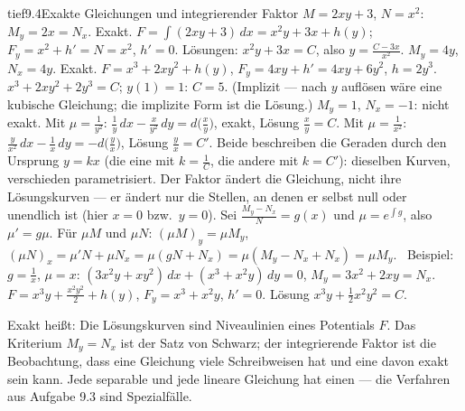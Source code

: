 \begin{loesungkarte}{tief}{9.4}{Exakte Gleichungen und integrierender Faktor}
$M = 2xy + 3$, $N = x^{2}$: $M_y = 2x = N_x$. Exakt. $F = \int(2xy + 3)\,dx = x^{2}y + 3x + h(y)$; $F_y = x^{2} + h' = N = x^{2}$, $h' = 0$. Lösungen: $x^{2}y + 3x = C$, also $y = \frac{C - 3x}{x^{2}}$.
$M_y = 4y$, $N_x = 4y$. Exakt. $F = x^{3} + 2xy^{2} + h(y)$, $F_y = 4xy + h' = 4xy + 6y^{2}$, $h = 2y^{3}$. $x^{3} + 2xy^{2} + 2y^{3} = C$; $y(1) = 1$: $C = 5$. (Implizit --- nach $y$ auflösen wäre eine kubische Gleichung; die implizite Form ist die Lösung.)
$M_y = 1$, $N_x = -1$: nicht exakt. Mit $\mu = \frac1{y^{2}}$: $\frac1y\,dx - \frac x{y^{2}}\,dy = d\bigl(\frac xy\bigr)$, exakt, Lösung $\frac xy = C$. Mit $\mu = \frac1{x^{2}}$: $\frac y{x^{2}}\,dx - \frac1x\,dy = -d\bigl(\frac yx\bigr)$, Lösung $\frac yx = C'$. Beide beschreiben die Geraden durch den Ursprung $y = kx$ (die eine mit $k = \frac1C$, die andere mit $k = C'$): dieselben Kurven, verschieden parametrisiert. Der Faktor ändert die Gleichung, nicht ihre Lösungskurven --- er ändert nur die Stellen, an denen er selbst null oder unendlich ist (hier $x = 0$ bzw.\ $y = 0$).
Sei $\frac{M_y - N_x}N = g(x)$ und $\mu = e^{\int g}$, also $\mu' = g\mu$. Für $\mu M$ und $\mu N$: $(\mu M)_y = \mu M_y$, $(\mu N)_x = \mu'N + \mu N_x = \mu(gN + N_x) = \mu(M_y - N_x + N_x) = \mu M_y$. \checkmark\ Beispiel: $g = \frac1x$, $\mu = x$: $(3x^{2}y + xy^{2})\,dx + (x^{3} + x^{2}y)\,dy = 0$, $M_y = 3x^{2} + 2xy = N_x$. \checkmark\ $F = x^{3}y + \frac{x^{2}y^{2}}2 + h(y)$, $F_y = x^{3} + x^{2}y$, $h' = 0$. Lösung $x^{3}y + \frac12x^{2}y^{2} = C$.
\begin{mitnehmen}\kastentext
Exakt heißt: Die Lösungskurven sind Niveaulinien eines Potentials $F$. Das Kriterium $M_y = N_x$ ist der Satz von Schwarz; der integrierende Faktor ist die Beobachtung, dass eine Gleichung viele Schreibweisen hat und eine davon exakt sein kann. Jede separable und jede lineare Gleichung hat einen --- die Verfahren aus Aufgabe 9.3 sind Spezialfälle.
\end{mitnehmen}
\end{loesungkarte}

